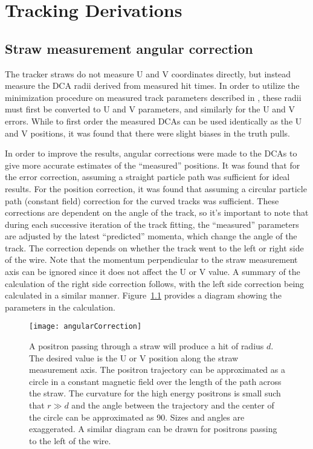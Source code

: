 
\thispagestyle{myheadings}

\graphicspath{{Body/Figures/TrackingFigures/CoordSys/}}

\chapter{Tracking Derivations}

\section{Straw measurement angular correction}
\label{app:angularcorrection}


The tracker straws do not measure U and V coordinates directly, but instead measure the DCA radii derived from measured hit times. In order to utilize the minimization procedure on measured track parameters described in , these radii must first be converted to U and V parameters, and similarly for the U and V errors. While to first order the measured DCAs can be used identically as the U and V positions, it was found that there were slight biases in the truth pulls.

In order to improve the results, angular corrections were made to the DCAs to give more accurate estimates of the ``measured'' positions. It was found that for the error correction, assuming a straight particle path was sufficient for ideal results. For the position correction, it was found that assuming a circular particle path (constant field) correction for the curved tracks was sufficient. These corrections are dependent on the angle of the track, so it's important to note that during each successive iteration of the track fitting, the ``measured'' parameters are adjusted by the latest ``predicted'' momenta, which change the angle of the track. The correction depends on whether the track went to the left or right side of the wire. Note that the momentum perpendicular to the straw measurement axis can be ignored since it does not affect the U or V value. A summary of the calculation of the right side correction follows, with the left side correction being calculated in a similar manner. Figure~\ref{fig:angularCorrection} provides a diagram showing the parameters in the calculation.

\begin{figure}
	\centering
	\texttt{[image: angularCorrection]}
	\caption[Angular correction for measured DCAs]{A positron passing through a straw will produce a hit of radius $d$. The desired value is the U or V position along the straw measurement axis. The positron trajectory can be approximated as a circle in a constant magnetic field over the length of the path across the straw. The curvature for the high energy positrons is small such that $r \gg d$ and the angle between the trajectory and the center of the circle can be approximated as 90\textdegree{}. Sizes and angles are exaggerated. A similar diagram can be drawn for positrons passing to the left of the wire.}
	\label{fig:angularCorrection}
\end{figure}

